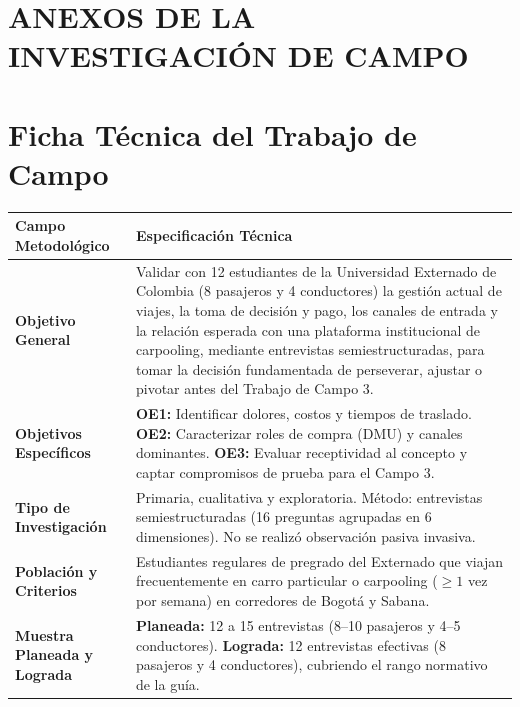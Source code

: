 \documentclass[11pt,a4paper]{article}
\begin{document}
\appendix
\section*{ANEXOS DE LA INVESTIGACI\'ON DE CAMPO}

\section{Ficha T\'ecnica del Trabajo de Campo}

\begin{table}[!htbp]
\centering
\small
\renewcommand{\arraystretch}{1.15}
\begin{tabularx}{\textwidth}{>{\raggedright\arraybackslash\bfseries}p{3.8cm}X}
\toprule
Campo Metodol\'ogico & Especificaci\'on T\'ecnica \\
\midrule
Objetivo General & Validar con 12 estudiantes de la Universidad Externado de Colombia (8 pasajeros y 4 conductores) la gesti\'on actual de viajes, la toma de decisi\'on y pago, los canales de entrada y la relaci\'on esperada con una plataforma institucional de carpooling, mediante entrevistas semiestructuradas, para tomar la decisi\'on fundamentada de perseverar, ajustar o pivotar antes del Trabajo de Campo 3. \\
\midrule
Objetivos Espec\'ificos & \textbf{OE1:} Identificar dolores, costos y tiempos de traslado. \textbf{OE2:} Caracterizar roles de compra (DMU) y canales dominantes. \textbf{OE3:} Evaluar receptividad al concepto y captar compromisos de prueba para el Campo 3. \\
\midrule
Tipo de Investigaci\'on & Primaria, cualitativa y exploratoria. M\'etodo: entrevistas semiestructuradas (16 preguntas agrupadas en 6 dimensiones). No se realiz\'o observaci\'on pasiva invasiva. \\
\midrule
Poblaci\'on y Criterios & Estudiantes regulares de pregrado del Externado que viajan frecuentemente en carro particular o carpooling ($\ge 1$ vez por semana) en corredores de Bogot\'a y Sabana. \\
\midrule
Muestra Planeada y Lograda & \textbf{Planeada:} 12 a 15 entrevistas (8--10 pasajeros y 4--5 conductores). \textbf{Lograda:} 12 entrevistas efectivas (8 pasajeros y 4 conductores), cubriendo el rango normativo de la gu\'ia. \\

\end{tabularx}
\end{table}
\end{document}
